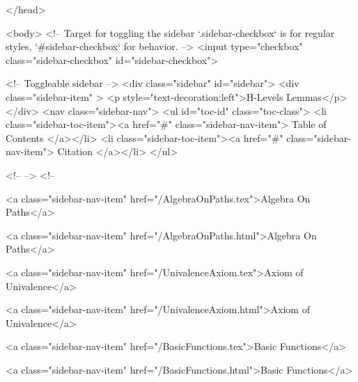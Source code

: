   
</head>




  <body>
    <!-- Target for toggling the sidebar `.sidebar-checkbox` is for regular
     styles, `#sidebar-checkbox` for behavior. -->
<input type="checkbox" class="sidebar-checkbox" id="sidebar-checkbox">

<!-- Toggleable sidebar -->
<div class="sidebar" id="sidebar">
  <div class="sidebar-item" >
    <p style="text-decoration:left">H-Levels Lemmas</p>
  </div>
  <nav class="sidebar-nav">
    <ul id="toc-id" class="toc-class">
  <li class="sidebar-toc-item"><a href="#" class="sidebar-nav-item"> Table of Contents </a></li>
  <li class="sidebar-toc-item"><a href="#" class="sidebar-nav-item"> Citation </a></li>
</ul>


    <!--  -->
    <!-- 
      
    
      
    
      
    
      
        
      
    
      
        
          <a class="sidebar-nav-item" href="/AlgebraOnPaths.tex">Algebra On Paths</a>
        
      
    
      
        
          <a class="sidebar-nav-item" href="/AlgebraOnPaths.html">Algebra On Paths</a>
        
      
    
      
        
          <a class="sidebar-nav-item" href="/UnivalenceAxiom.tex">Axiom of Univalence</a>
        
      
    
      
        
          <a class="sidebar-nav-item" href="/UnivalenceAxiom.html">Axiom of Univalence</a>
        
      
    
      
        
          <a class="sidebar-nav-item" href="/BasicFunctions.tex">Basic Functions</a>
        
      
    
      
        
          <a class="sidebar-nav-item" href="/BasicFunctions.html">Basic Functions</a>
        
      
    
      
        
